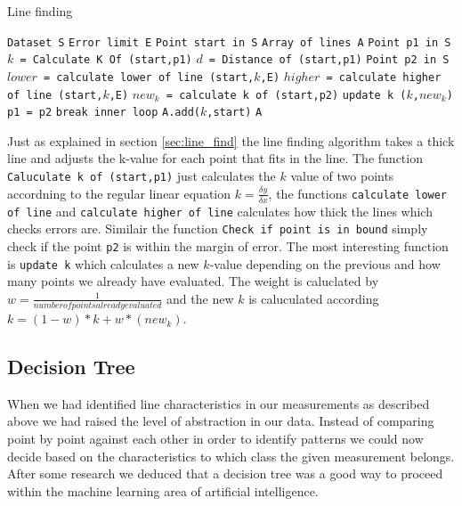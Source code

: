 \documentclass[a4paper, 10pt, conference]{ieeeconf}      %
\begin{document}
\begin{algorithm}
  \caption{\label{lineFinding}Line finding}
  \begin{algorithmic}[1]
      \State \texttt{Dataset S}
      \State \texttt{Error limit E}
      \State \texttt{Point start in S}
      \State \texttt{Array of lines A}
      	\State \texttt{Point p1 in S}
      	\State \texttt{$k$ = Calculate K Of (start,p1)}
      	\State \texttt{$d$ = Distance of (start,p1)}
      		\State \texttt{Point p2 in S}
      		\State \texttt{$lower$ = calculate lower of line (start,$k$,E)}
      		\State \texttt{$higher$ = calculate higher of line (start,$k$,E)}
      			\State \texttt{$new_k$ = calculate k of (start,p2)}
      			\State \texttt{update k ($k$,$new_k$)}
      			\State \texttt{p1 = p2}
      		\Else
      			\State \texttt{break inner loop}
      		\EndIf
      	\EndWhile
      		\State \texttt{A.add($k$,start)}
      	\EndIf
      \EndWhile
      \Return \texttt{A}
  \end{algorithmic}
\end{algorithm}

Just as explained in section \ref{sec:line_find} the line finding algorithm takes a thick line and adjusts the k-value for each point that fits in the line. The function \texttt{Caluculate k of (start,p1)} just calculates the $k$ value of two points accordning to the regular linear equation $k = \frac{\delta y}{\delta x}$, the functions \texttt{calculate lower of line} and \texttt{calculate higher of line} calculates how thick the lines which checks errors are. Similair the function \texttt{Check if point is in bound} simply check if the point \texttt{p2} is within the margin of error. The most interesting function is \texttt{update k} which calculates a new $k$-value depending on the previous and how many points we already have evaluated. The weight is caluclated by $w = \frac{1}{number of points already evaluated}$ and the new $k$ is caluculated according $k = (1-w)*k + w*(new_k)$.

\subsection{Decision Tree}
When we had identified line characteristics in our measurements as described above we had raised the level of abstraction in our data. Instead of comparing point by point against each other in order to identify patterns we could now decide based on the characteristics to which class the given measurement belongs. After some research we deduced that a decision tree was a good way to proceed within the machine learning area of artificial intelligence.
\end{document}

